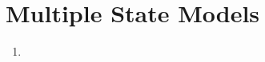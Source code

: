 \section{Multiple State Models}
\label{sect:mult-state-models}
\begin{enumerate}
\item 
\end{enumerate}

